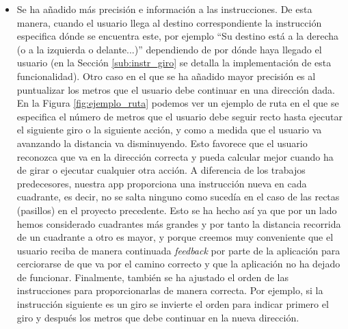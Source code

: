\begin{itemize}
	\item Se ha añadido más precisión e información a las instrucciones. De esta manera, cuando el usuario llega al destino correspondiente la instrucción especifica dónde se encuentra este, por ejemplo ``Su destino está a la derecha (o a la izquierda o delante...)'' dependiendo de por dónde haya llegado el usuario (en la Sección \ref{sub:instr_giro} se detalla la implementación de esta funcionalidad). Otro caso en el que se ha añadido mayor precisión es al puntualizar los metros que el usuario debe continuar en una dirección dada. En la Figura \ref{fig:ejemplo_ruta} podemos ver un ejemplo de ruta en el que se especifica el número de metros que el usuario debe seguir recto hasta ejecutar el siguiente giro o la siguiente acción, y como a medida que el usuario va avanzando la distancia va disminuyendo. Esto favorece que el usuario reconozca que va en la dirección correcta y pueda calcular mejor cuando ha de girar o ejecutar cualquier otra acción. A diferencia de los trabajos predecesores, nuestra app proporciona una instrucción nueva en cada cuadrante, es decir, no se salta ninguno como sucedía en el caso de las rectas (pasillos) en el proyecto precedente. Esto se ha hecho así ya que por un lado hemos considerado cuadrantes más grandes y por tanto la distancia recorrida de un cuadrante a otro es mayor, y porque creemos muy conveniente que el usuario reciba de manera continuada \textit{feedback} por parte de la aplicación para cerciorarse de que va por el camino correcto y que la aplicación no ha dejado de funcionar. Finalmente, también se ha ajustado el orden de las instrucciones para proporcionarlas de manera correcta. Por ejemplo, si la instrucción siguiente es un giro se invierte el orden para indicar primero el giro y después los metros que debe continuar en la nueva dirección.
	

\end{itemize}
